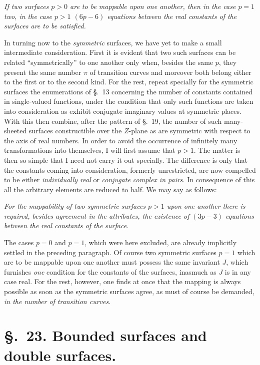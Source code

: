 \documentclass{article}
\begin{document}
\emph{If two surfaces $p > 0$ are to be mappable upon one another, then in the case $p = 1$ two, in the case $p > 1$ $(6p - 6)$ equations between the real constants of the surfaces are to be satisfied.}

In turning now to the \emph{symmetric} surfaces, we have yet to make a small intermediate consideration. First it is evident that two such surfaces can be related “symmetrically” to one another only when, besides the same $p$, they present the same number $\pi$ of transition curves and moreover both belong either to the first or to the second kind. For the rest, repeat specially for the symmetric surfaces the enumerations of §.~13 concerning the number of constants contained in single-valued functions, under the condition that only such functions are taken into consideration as exhibit conjugate imaginary values at symmetric places. With this then combine, after the pattern of §.~19, the number of such many-sheeted surfaces constructible over the $Z$-plane as are symmetric with respect to the axis of real numbers. In order to avoid the occurrence of infinitely many transformations into themselves, I will first assume that $p > 1$. The matter is then so simple that I need not carry it out specially. The difference is only that the constants coming into consideration, formerly unrestricted, are now compelled to be either \emph{individually real} or \emph{conjugate complex in pairs}. In consequence of this all the arbitrary elements are reduced to half. We may say as follows:


\emph{For the mappability of two symmetric surfaces $p > 1$ upon one another there is required, besides agreement in the attributes, the existence of $(3p - 3)$ equations between the real constants of the surface.}

The cases $p = 0$ and $p = 1$, which were here excluded, are already implicitly settled in the preceding paragraph. Of course two symmetric surfaces $p = 1$ which are to be mappable upon one another must possess the same invariant $J$, which furnishes \emph{one} condition for the constants of the surfaces, inasmuch as $J$ is in any case real. For the rest, however, one finds at once that the mapping is always possible as soon as the symmetric surfaces agree, as must of course be demanded, \emph{in the number of transition curves}.

\section*{§.~23. Bounded surfaces and double surfaces.}
\end{document}
